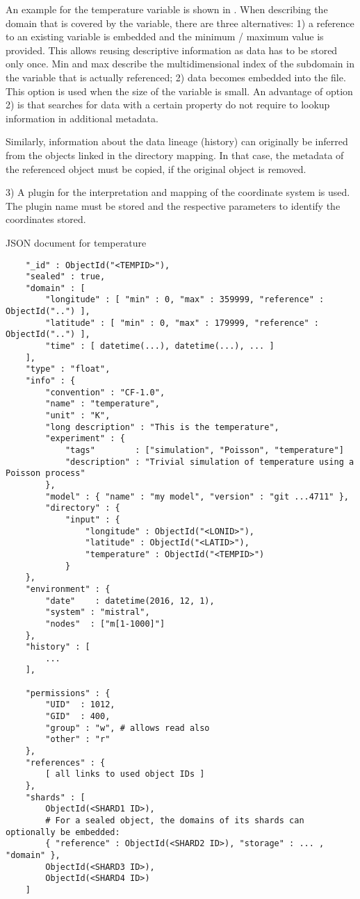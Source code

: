 An example for the temperature variable is shown in .
When describing the domain that is covered by the variable, there are three alternatives:
1) a reference to an existing variable is embedded and the minimum / maximum value is provided.
This allows reusing descriptive information as data has to be stored only once. Min and max describe the multidimensional index of the subdomain in the variable that is actually referenced;
2) data becomes embedded into the file. This option is used when the size of the variable is small.
An advantage of option 2) is that searches for data with a certain property do not require to lookup information in additional metadata.

Similarly, information about the data lineage (history) can originally be inferred from the objects linked in the directory mapping.
In that case, the metadata of the referenced object must be copied, if the original object is removed.

3) A plugin for the interpretation and mapping of the coordinate system is used.
The plugin name must be stored and the respective parameters to identify the coordinates stored.


\begin{tcbcode}[label={lst:mongotemperature}]{JSON document for temperature}
	\begin{lstlisting}
	"_id" : ObjectId("<TEMPID>"),
	"sealed" : true,
	"domain" : [
		"longitude" : [ "min" : 0, "max" : 359999, "reference" : ObjectId("..") ],
		"latitude" : [ "min" : 0, "max" : 179999, "reference" : ObjectId("..") ],
		"time" : [ datetime(...), datetime(...), ... ]
	],
	"type" : "float",
	"info" : {
		"convention" : "CF-1.0",
		"name" : "temperature",
		"unit" : "K",
		"long description" : "This is the temperature",
		"experiment" : {
			"tags"        : ["simulation", "Poisson", "temperature"]
			"description" : "Trivial simulation of temperature using a Poisson process"
		},
		"model" : { "name" : "my model", "version" : "git ...4711" },
		"directory" : {
			"input" : {
				"longitude" : ObjectId("<LONID>"),
				"latitude" : ObjectId("<LATID>"),
				"temperature" : ObjectId("<TEMPID>")
			}
	},
	"environment" : {
		"date"    : datetime(2016, 12, 1),
		"system" : "mistral",
		"nodes"  : ["m[1-1000]"]
	},
	"history" : [
		...
	],

	"permissions" : {
		"UID"  : 1012,
		"GID"  : 400,
		"group" : "w", # allows read also
		"other" : "r"
	},
	"references" : {
		[ all links to used object IDs ]
	},
	"shards" : [
		ObjectId(<SHARD1 ID>),
		# For a sealed object, the domains of its shards can optionally be embedded:
		{ "reference" : ObjectId(<SHARD2 ID>), "storage" : ... , "domain" },
		ObjectId(<SHARD3 ID>),
		ObjectId(<SHARD4 ID>)
	]
	\end{lstlisting}
\end{tcbcode}

